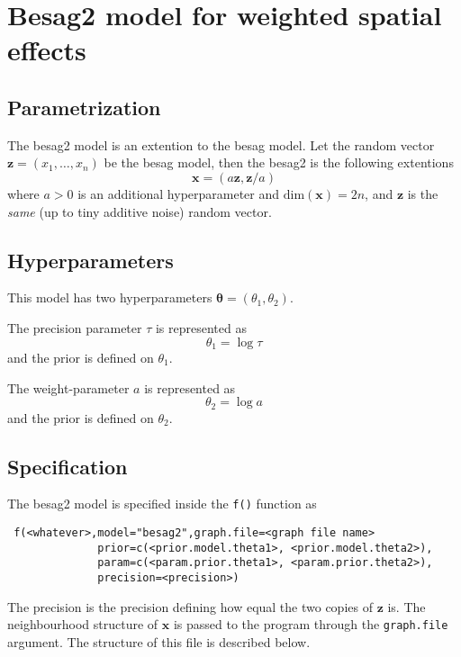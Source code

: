 \documentclass[a4paper,11pt]{article}
\begin{document}
\section*{Besag2 model for weighted spatial effects}

\subsection*{Parametrization}

The besag2 model is an extention to the besag model. Let the random
vector $\mathbf{z}=(x_1,\dots,x_n)$ be the besag model, then the
besag2 is the following extentions
\begin{displaymath}
    \mathbf{x} = (a\mathbf{z}, \mathbf{z}/a)
\end{displaymath}
where $a>0$ is an additional hyperparameter and
$\text{dim}(\mathbf{x}) = 2n$, and $\mathbf{z}$ is the \emph{same} (up
to tiny additive noise) random vector.

\subsection*{Hyperparameters}

This model has two hyperparameters $\mathbf{\theta} = (\theta_{1},
\theta_{2})$.

The precision parameter $\tau$ is represented as
\begin{displaymath}
    \theta_{1} =\log \tau
\end{displaymath}
and the prior is defined on $\theta_{1}$.

The weight-parameter $a$ is represented as
\begin{displaymath}
    \theta_{2} = \log a
\end{displaymath}
and the prior is defined on $\theta_{2}$.

\subsection*{Specification}

The besag2 model is specified inside the {\tt f()} function as
\begin{verbatim}
 f(<whatever>,model="besag2",graph.file=<graph file name>
              prior=c(<prior.model.theta1>, <prior.model.theta2>),
              param=c(<param.prior.theta1>, <param.prior.theta2>),
              precision=<precision>)
\end{verbatim}

The precision is the precision defining how equal the two copies of
$\mathbf{z}$ is. The neighbourhood structure of $\mathbf{x}$ is passed
to the program through the {\tt graph.file} argument.  The structure
of this file is described below.
\end{document}
